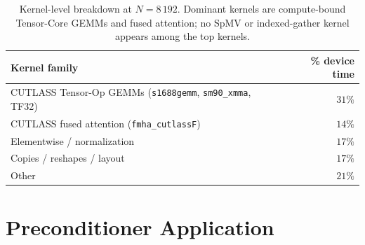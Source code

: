\documentclass[acmtog]{acmart}
\theoremstyle{plain}
\begin{document}
\begin{table}[t]
\centering
\caption{Kernel-level breakdown at $N\!=\!8\,192$. Dominant kernels are compute-bound
Tensor-Core GEMMs and fused attention; no SpMV or indexed-gather kernel appears among the
top kernels.}
\label{tab:breakdown-kernel}
\footnotesize\setlength{\tabcolsep}{4pt}
\begin{tabular}{@{}lr@{}}
\toprule
Kernel family & \% device time \\
\midrule
CUTLASS Tensor-Op GEMMs (\texttt{s1688gemm}, \texttt{sm90\_xmma}, TF32) & $31\%$ \\
CUTLASS fused attention (\texttt{fmha\_cutlassF}) & $14\%$ \\
Elementwise / normalization                       & $17\%$ \\
Copies / reshapes / layout                        & $17\%$ \\
Other                                             & $21\%$ \\
\bottomrule
\end{tabular}
\end{table}

\section{Preconditioner Application}
\label{sec:application}
\end{document}

